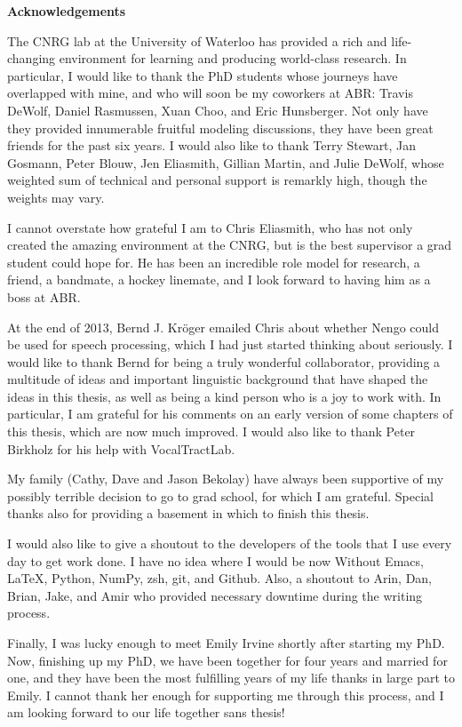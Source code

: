 \begin{center}\textbf{Acknowledgements}\end{center}

The CNRG lab at the University of Waterloo
has provided a rich and life-changing
environment for learning and
producing world-class research.
In particular, I would like to thank
the PhD students whose journeys
have overlapped with mine,
and who will soon be my coworkers at ABR:
Travis DeWolf, Daniel Rasmussen, Xuan Choo,
and Eric Hunsberger.
Not only have they provided
innumerable fruitful modeling discussions,
they have been great friends
for the past six years.
I would also like to thank
Terry Stewart, Jan Gosmann, Peter Blouw,
Jen Eliasmith, Gillian Martin,
and Julie DeWolf,
whose weighted sum of
technical and personal support
is remarkly high,
though the weights may vary.

I cannot overstate how grateful I am
to Chris Eliasmith,
who has not only
created the amazing environment
at the CNRG,
but is the best supervisor
a grad student could hope for.
He has been an incredible
role model for research,
a friend, a bandmate,
a hockey linemate,
and I look forward
to having him as a boss
at ABR.

At the end of 2013,
Bernd J. Kr\"{o}ger emailed Chris
about whether Nengo could be used
for speech processing,
which I had just started
thinking about seriously.
I would like to thank Bernd
for being a truly wonderful collaborator,
providing a multitude of ideas
and important linguistic background
that have shaped the ideas in this thesis,
as well as being a kind person
who is a joy to work with.
In particular, I am grateful for
his comments on an early version of
some chapters of this thesis,
which are now much improved.
I would also like to thank Peter Birkholz
for his help with VocalTractLab.

My family (Cathy, Dave and Jason Bekolay)
have always been supportive
of my possibly terrible decision to go to grad school,
for which I am grateful.
Special thanks also for providing
a basement in which to finish this thesis.

I would also like to give a shoutout
to the developers of the tools
that I use every day to get work done.
I have no idea where I would be now
Without Emacs, \LaTeX, Python,
NumPy, zsh, git, and Github.
Also, a shoutout to Arin, Dan,
Brian, Jake, and Amir
who provided necessary downtime
during the writing process.

Finally, I was lucky enough to
meet Emily Irvine shortly after starting my PhD.
Now, finishing up my PhD,
we have been together for four years
and married for one,
and they have been the most fulfilling
years of my life
thanks in large part to Emily.
I cannot thank her enough for
supporting me through this process,
and I am looking forward
to our life together sans thesis!

\cleardoublepage
